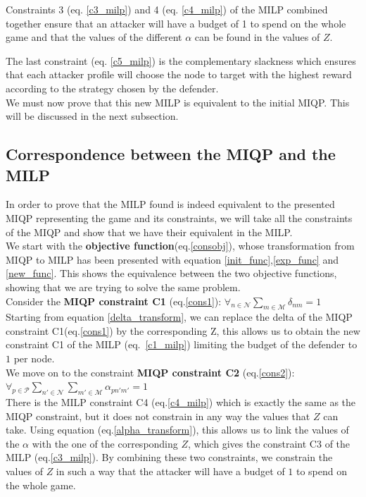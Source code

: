 Constraints 3 (eq. \ref{c3_milp}) and 4 (eq. \ref{c4_milp}) of the MILP combined together ensure that an attacker will have a budget of 1 to spend on the whole game and that the values of the different $\alpha$ can be found in the values of $Z$.

The last constraint (eq. \ref{c5_milp}) is the complementary slackness which ensures that each attacker profile will choose the node to target with the highest reward according to the strategy chosen by the defender. \\

We must now prove that this new MILP is equivalent to the initial MIQP. This will be discussed in the next subsection.

\subsection{Correspondence between the MIQP and the MILP }


In order to prove that the MILP found is indeed equivalent to the presented MIQP representing the game and its constraints, we will take all the constraints of the MIQP and show that we have their equivalent in the MILP. \\

We start with the \textbf{objective function}(eq.\ref{consobj}), whose transformation from MIQP to MILP has been presented with equation \ref{init_func},\ref{exp_func} and \ref{new_func}. This shows the equivalence between the two objective functions, showing that we are trying to solve the same problem. \\

Consider the \textbf{MIQP constraint C1} (eq.\ref{cons1}): $\forall_{n \in \mathcal{N}} \sum_{m \in \mathcal{M}} \delta_{nm} = 1$ \\
Starting from equation \ref{delta_transform}, we can replace the delta of the MIQP constraint C1(eq.\ref{cons1}) by the corresponding Z, this allows us to obtain the new constraint C1 of the MILP (eq.~\ref{c1_milp})  limiting the budget of the defender to $1$ per node. \\

We move on to the constraint \textbf{MIQP constraint C2} (eq.\ref{cons2}): $\forall_{p \in \mathcal{P}} \sum_{n'\in \mathcal{N}} \sum_{m'\in \mathcal{M}} \alpha_{pn'm'} = 1$ \\
There is the MILP constraint C4 (eq.\ref{c4_milp})  which is exactly the same as the MIQP constraint, but it does not constrain in any way the values that $Z$ can take. 
Using equation (eq.\ref{alpha_transform}), this allows us to link the values of the $\alpha$ with the one  of the corresponding $Z$, which gives the constraint C3 of the MILP (eq.\ref{c3_milp}).
By combining these two constraints, we constrain the values of $Z$ in such a way that the attacker will have a budget of $1$ to spend on the whole game. \\

